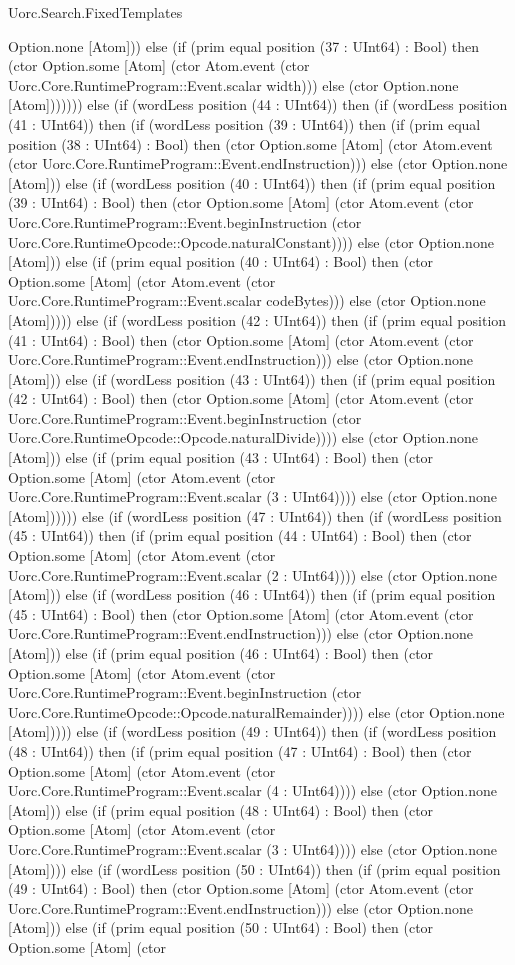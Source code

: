 \begin{lexlean}{Uorc.Search.FixedTemplates}
\begin{semanticmodule}
{Option.none [Atom])) else (if (prim equal position (37 : UInt64) : Bool) then (ctor Option.some [Atom] (ctor Atom.event (ctor Uorc.Core.RuntimeProgram::Event.scalar width))) else (ctor Option.none [Atom])))))) else (if (wordLess position (44 : UInt64)) then (if (wordLess position (41 : UInt64)) then (if (wordLess position (39 : UInt64)) then (if (prim equal position (38 : UInt64) : Bool) then (ctor Option.some [Atom] (ctor Atom.event (ctor Uorc.Core.RuntimeProgram::Event.endInstruction))) else (ctor Option.none [Atom])) else (if (wordLess position (40 : UInt64)) then (if (prim equal position (39 : UInt64) : Bool) then (ctor Option.some [Atom] (ctor Atom.event (ctor Uorc.Core.RuntimeProgram::Event.beginInstruction (ctor Uorc.Core.RuntimeOpcode::Opcode.naturalConstant)))) else (ctor Option.none [Atom])) else (if (prim equal position (40 : UInt64) : Bool) then (ctor Option.some [Atom] (ctor Atom.event (ctor Uorc.Core.RuntimeProgram::Event.scalar codeBytes))) else (ctor Option.none [Atom])))) else (if (wordLess position (42 : UInt64)) then (if (prim equal position (41 : UInt64) : Bool) then (ctor Option.some [Atom] (ctor Atom.event (ctor Uorc.Core.RuntimeProgram::Event.endInstruction))) else (ctor Option.none [Atom])) else (if (wordLess position (43 : UInt64)) then (if (prim equal position (42 : UInt64) : Bool) then (ctor Option.some [Atom] (ctor Atom.event (ctor Uorc.Core.RuntimeProgram::Event.beginInstruction (ctor Uorc.Core.RuntimeOpcode::Opcode.naturalDivide)))) else (ctor Option.none [Atom])) else (if (prim equal position (43 : UInt64) : Bool) then (ctor Option.some [Atom] (ctor Atom.event (ctor Uorc.Core.RuntimeProgram::Event.scalar (3 : UInt64)))) else (ctor Option.none [Atom]))))) else (if (wordLess position (47 : UInt64)) then (if (wordLess position (45 : UInt64)) then (if (prim equal position (44 : UInt64) : Bool) then (ctor Option.some [Atom] (ctor Atom.event (ctor Uorc.Core.RuntimeProgram::Event.scalar (2 : UInt64)))) else (ctor Option.none [Atom])) else (if (wordLess position (46 : UInt64)) then (if (prim equal position (45 : UInt64) : Bool) then (ctor Option.some [Atom] (ctor Atom.event (ctor Uorc.Core.RuntimeProgram::Event.endInstruction))) else (ctor Option.none [Atom])) else (if (prim equal position (46 : UInt64) : Bool) then (ctor Option.some [Atom] (ctor Atom.event (ctor Uorc.Core.RuntimeProgram::Event.beginInstruction (ctor Uorc.Core.RuntimeOpcode::Opcode.naturalRemainder)))) else (ctor Option.none [Atom])))) else (if (wordLess position (49 : UInt64)) then (if (wordLess position (48 : UInt64)) then (if (prim equal position (47 : UInt64) : Bool) then (ctor Option.some [Atom] (ctor Atom.event (ctor Uorc.Core.RuntimeProgram::Event.scalar (4 : UInt64)))) else (ctor Option.none [Atom])) else (if (prim equal position (48 : UInt64) : Bool) then (ctor Option.some [Atom] (ctor Atom.event (ctor Uorc.Core.RuntimeProgram::Event.scalar (3 : UInt64)))) else (ctor Option.none [Atom]))) else (if (wordLess position (50 : UInt64)) then (if (prim equal position (49 : UInt64) : Bool) then (ctor Option.some [Atom] (ctor Atom.event (ctor Uorc.Core.RuntimeProgram::Event.endInstruction))) else (ctor Option.none [Atom])) else (if (prim equal position (50 : UInt64) : Bool) then (ctor Option.some [Atom] (ctor }
\end{semanticmodule}
\end{lexlean}
